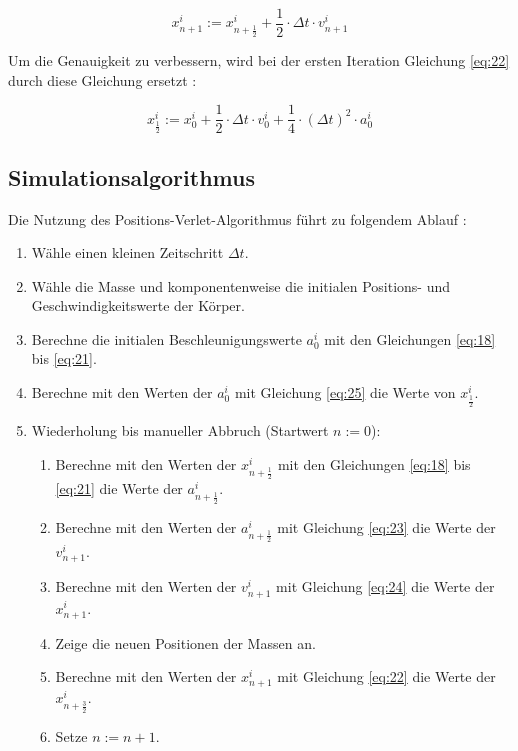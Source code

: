 \documentclass[10pt,twocolumn]{scrartcl}
\begin{document}
\begin{equation}x_{n+1}^i := x_{n+\frac{1}{2}}^i + \frac{1}{2} \cdot \Delta t \cdot v_{n+1}^i
\label{eq:24}
\end{equation}

Um die Genauigkeit zu verbessern, wird bei der ersten Iteration Gleichung \eqref{eq:22} durch diese Gleichung ersetzt \cite{MicrosoftOJ}:

\begin{equation}x_{\frac{1}{2}}^i := x_0^i + \frac{1}{2} \cdot \Delta t \cdot v_0^i
+ \frac{1}{4} \cdot (\Delta t)^2 \cdot a_0^i
\label{eq:25}
\end{equation}


\subsection{Simulationsalgorithmus}
Die Nutzung des Positions-Verlet-Algorithmus führt zu folgendem Ablauf \cite{MicrosoftOJ}:

\begin{enumerate}
	\item Wähle einen kleinen Zeitschritt $\Delta t$.
	\item Wähle die Masse und komponentenweise die initialen Positions- und Geschwindigkeitswerte der Körper.
	\item Berechne die initialen Beschleunigungswerte $a_0^i$ mit den Gleichungen \eqref{eq:18} bis \eqref{eq:21}.
	\item Berechne mit den Werten der $a_0^i$ mit Gleichung \eqref{eq:25} die Werte von $x_{\frac{1}{2}}^i$.
	\item Wiederholung bis manueller Abbruch (Startwert $n:=0$):
	\begin{enumerate}
		\item Berechne mit den Werten der $x_{n+\frac{1}{2}}^i$ mit den Gleichungen \eqref{eq:18} bis \eqref{eq:21} die Werte der $a_{n+\frac{1}{2}}^i$.
		\item Berechne mit den Werten der $a_{n+\frac{1}{2}}^i$ mit Gleichung \eqref{eq:23} die Werte der $v_{n+1}^i$.
		\item Berechne mit den Werten der $v_{n+1}^i$ mit Gleichung \eqref{eq:24} die Werte der $x_{n+1}^i$.
		\item Zeige die neuen Positionen der Massen an.
		\item Berechne mit den Werten der $x_{n+1}^i$ mit Gleichung \eqref{eq:22} die Werte der $x_{n+\frac{3}{2}}^i$.
		\item Setze $n := n+1$.
	\end{enumerate}
\end{enumerate}
\end{document}
